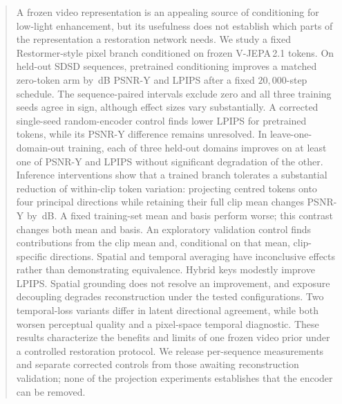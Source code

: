 \begin{abstract}
A frozen video representation is an appealing source of conditioning for
low-light enhancement, but its usefulness does not establish which parts of
the representation a restoration network needs. We study a fixed
Restormer-style pixel branch conditioned on frozen V-JEPA\,2.1 tokens.
On held-out SDSD sequences, pretrained conditioning improves a matched
zero-token arm by \,dB PSNR-Y and
 LPIPS after a fixed $20{,}000$-step schedule.
The sequence-paired intervals exclude zero and all three training seeds agree
in sign, although effect sizes vary substantially.
A corrected single-seed random-encoder control finds lower LPIPS for pretrained
tokens, while its PSNR-Y difference remains unresolved.
In leave-one-domain-out training, each of three held-out domains improves on
at least one of PSNR-Y and LPIPS without significant degradation of the other.
Inference interventions show that a trained branch tolerates a substantial
reduction of within-clip token variation: projecting centred tokens onto four
principal directions while retaining their full clip mean changes PSNR-Y by
\,dB. A fixed training-set mean and basis perform worse;
this contrast changes both mean and basis. An exploratory validation control
finds contributions from the clip mean and, conditional on that mean,
clip-specific directions. Spatial and temporal averaging have inconclusive effects rather
than demonstrating equivalence.
Hybrid keys modestly improve LPIPS. Spatial grounding does not resolve an improvement, and exposure decoupling
degrades reconstruction under the tested configurations.
Two temporal-loss variants differ in latent directional agreement, while both
worsen perceptual quality and a pixel-space temporal diagnostic.
These results characterize the benefits and limits of one frozen video prior
under a controlled restoration protocol. We release per-sequence measurements
and separate corrected controls from those awaiting reconstruction validation;
none of the projection experiments establishes that the encoder
can be removed.
\end{abstract}
